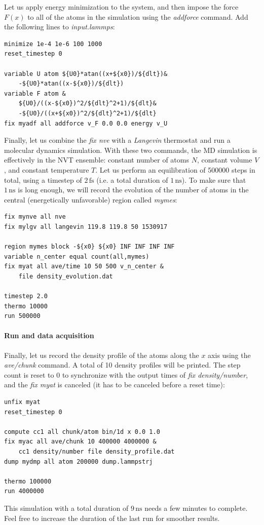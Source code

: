 \documentclass[9pt,tutorial]{livecoms}
\begin{document}
Let us apply energy minimization to the system, and then impose the force $F(x)$ to all of the atoms in the simulation using the \textit{addforce} command. Add the following lines to \textit{input.lammps}:
{\normalsize \begin{verbatim}
minimize 1e-4 1e-6 100 1000
reset_timestep 0

variable U atom ${U0}*atan((x+${x0})/${dlt})&
    -${U0}*atan((x-${x0})/${dlt})
variable F atom &
    ${U0}/((x-${x0})^2/${dlt}^2+1)/${dlt}&
    -${U0}/((x+${x0})^2/${dlt}^2+1)/${dlt}
fix myadf all addforce v_F 0.0 0.0 energy v_U
\end{verbatim}}
Finally, let us combine the \textit{fix nve} with a \textit{Langevin} thermostat and run a molecular dynamics simulation. With these two commands, the MD simulation is effectively in the NVT ensemble: constant number of atoms $N$, constant volume $V$, and constant temperature $T$. Let us perform an equilibration of 500000 steps in total, using a timestep of $2\,\text{fs}$ (i.e. a total duration of $1\,\text{ns}$). To make sure that $1\,\text{ns}$ is long enough, we will record the evolution of the number of atoms in the central (energetically unfavorable) region called \textit{mymes}:
{\normalsize \begin{verbatim}
fix mynve all nve
fix mylgv all langevin 119.8 119.8 50 1530917

region mymes block -${x0} ${x0} INF INF INF INF 
variable n_center equal count(all,mymes)
fix myat all ave/time 10 50 500 v_n_center &
    file density_evolution.dat

timestep 2.0
thermo 10000
run 500000
\end{verbatim}}

\paragraph{Run and data acquisition}
Finally, let us record the density profile of the atoms along the $x$ axis using the \textit{ave/chunk} command. A total of 10 density profiles will be printed. The step count is reset to 0 to synchronize with the output times of \textit{fix density/number}, and the \textit{fix myat} is canceled (it has to be canceled before a reset time):
{\normalsize \begin{verbatim}
unfix myat
reset_timestep 0

compute cc1 all chunk/atom bin/1d x 0.0 1.0
fix myac all ave/chunk 10 400000 4000000 &
    cc1 density/number file density_profile.dat
dump mydmp all atom 200000 dump.lammpstrj

thermo 100000
run 4000000
\end{verbatim}}
This simulation with a total duration of $9\,\text{ns}$ needs a few minutes to complete. Feel free to increase the duration of the last run for smoother results.
\end{document}
